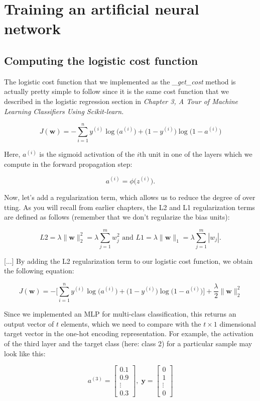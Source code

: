 \documentclass[letterpaper]{report}
\begin{document}
\section{Training an artificial neural network}

\subsection{Computing the logistic cost function}

The logistic cost function that we implemented as the \textit{\_get\_cost} method is actually pretty simple to follow since it is the same cost function that we described in the logistic regression section in \textit{Chapter 3, A Tour of Machine Learning Classifiers Using Scikit-learn.}

\[
J(\mathbf{w}) = -\sum_{i=1}^{n} y^{(i)} \log \big( a^{(i)} \big) + \big( 1 - y^{(i)} \big) \log \big( 1 - a^{(i)}\big)
\]

Here, $a^{(i)}$ is the sigmoid activation of the $i$th unit in one of the layers which we compute in the forward propagation step:

\[
a^{(i)} = \phi \big( z^{(i)} \big).
\]

Now, let's add a regularization term, which allows us to reduce the degree of over tting. As you will recall from earlier chapters, the L2 and L1 regularization terms are defined as follows (remember that we don't regularize the bias units):

\[
L2 = \lambda \lVert  \mathbf{w} \rVert^{2}_{2} = \lambda \sum_{j=1}^{m} w_{j}^{2} \text{ and } L1 = \lambda \lVert  \mathbf{w} \rVert_{1} = \lambda \sum_{j=1}^{m} | w_j |.
\]

[...] By adding the L2 regularization term to our logistic cost function, we obtain the following equation:

\[
J(\mathbf{w}) = - \Bigg[ \sum_{i=1}^{n} y^{(i)} \log \big( a^{(i)} \big) + \big(1 - y^{(i)} \big) \log \big(1- a^{(i)} \big) \Bigg] + \frac{\lambda}{2} \lVert  \mathbf{w} \rVert^{2}_{2}
\]

Since we implemented an MLP for multi-class classification, this returns an output vector of $t$ elements, which we need to compare with the $t \times 1$ dimensional target vector in the one-hot encoding representation. For example, the activation of the third layer and the target class (here: class 2) for a particular sample may look like this:

\[
a^{(3)} = 
\begin{bmatrix}
0.1 \\
0.9 \\
\vdots \\
0.3
\end{bmatrix}
 ,\; \mathbf{y} = 
 \begin{bmatrix}
0 \\
1 \\
\vdots \\
0
\end{bmatrix}
\]
\end{document}

